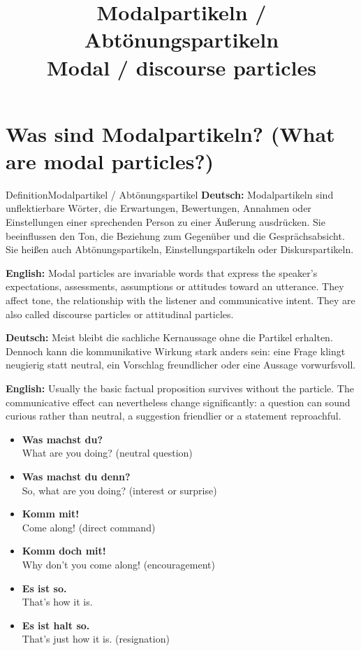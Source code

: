 \documentclass[a4paper,11pt]{article}
\title{Modalpartikeln / Abtönungspartikeln\\{\large\textnormal{Modal / discourse particles}}}
\date{}
\newcommand{\GermanText}[1]{\textbf{Deutsch: }#1\par}
\newcommand{\EnglishText}[1]{{\small\color{SoftGray}\textbf{English: }#1\par}}
\newcommand{\ExampleItem}[2]{\item \textbf{#1}\\{\small\color{SoftGray}#2}}
\begin{document}
\maketitle
\tableofcontents
\newpage
\section{Was sind Modalpartikeln? \textnormal{(What are modal particles?)}}
\begin{grammarentry}{Definition}{Modalpartikel / Abtönungspartikel}
\GermanText{Modalpartikeln sind unflektierbare Wörter, die Erwartungen, Bewertungen, Annahmen oder Einstellungen einer sprechenden Person zu einer Äußerung ausdrücken. Sie beeinflussen den Ton, die Beziehung zum Gegenüber und die Gesprächsabsicht. Sie heißen auch Abtönungspartikeln, Einstellungspartikeln oder Diskurspartikeln.}
\EnglishText{Modal particles are invariable words that express the speaker's expectations, assessments, assumptions or attitudes toward an utterance. They affect tone, the relationship with the listener and communicative intent. They are also called discourse particles or attitudinal particles.}
\end{grammarentry}
\GermanText{Meist bleibt die sachliche Kernaussage ohne die Partikel erhalten. Dennoch kann die kommunikative Wirkung stark anders sein: eine Frage klingt neugierig statt neutral, ein Vorschlag freundlicher oder eine Aussage vorwurfsvoll.}
\EnglishText{Usually the basic factual proposition survives without the particle. The communicative effect can nevertheless change significantly: a question can sound curious rather than neutral, a suggestion friendlier or a statement reproachful.}
\begin{exbox}\begin{itemize}
\ExampleItem{Was machst du?}{What are you doing? (neutral question)}
\ExampleItem{Was machst du denn?}{So, what are you doing? (interest or surprise)}
\ExampleItem{Komm mit!}{Come along! (direct command)}
\ExampleItem{Komm doch mit!}{Why don't you come along! (encouragement)}
\ExampleItem{Es ist so.}{That's how it is.}
\ExampleItem{Es ist halt so.}{That's just how it is. (resignation)}
\end{itemize}\end{exbox}
\end{document}
